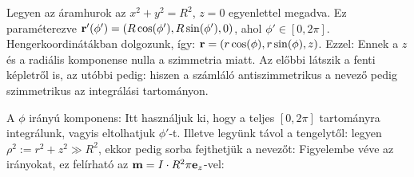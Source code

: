     Legyen az áramhurok az $x^2+y^2=R^2$, $z=0$ egyenlettel megadva. Ez paraméterezve $\mathbf{r}'(\phi')=(R\cos(\phi'),R\sin(\phi'),0)$, ahol $\phi'\in[0,2\pi]$. Hengerkoordinátákban dolgozunk, így: $\mathbf{r}=(r\cos(\phi),r\sin(\phi),z)$. Ezzel:
    Ennek a $z$ és a radiális komponense nulla a szimmetria miatt. Az előbbi látszik a fenti képletről is, az utóbbi pedig:
    hiszen a számláló antiszimmetrikus a nevező pedig szimmetrikus az integrálási tartományon.
    
    A $\phi$ irányú komponens:
    Itt használjuk ki, hogy a teljes $[0,2\pi]$ tartományra integrálunk, vagyis eltolhatjuk $\phi'$-t. Illetve legyünk távol a tengelytől: legyen $\rho^2:=r^2+z^2\gg R^2$, ekkor pedig sorba fejthetjük a nevezőt:
    Figyelembe véve az irányokat, ez felírható az $\mathbf{m}=I\cdot R^2\pi\mathbf{e}_z$-vel:
  
